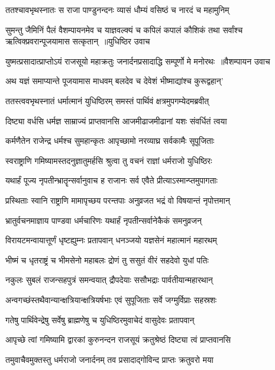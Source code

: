 \twolineshloka
{ततश्चावभृथस्नातः स राजा पाण्डुनन्दनः}
{व्यासं धौम्यं वसिष्ठं च नारदं च महामुनिम्}


\threelineshloka
{सुमन्तु जैमिनिं पैलं वैशम्पायनमेव च}
{याज्ञवल्क्यं च कपिलं कपालं कौशिकं तथा}
{सर्वांश्च ऋत्विक्प्रवरान्पूजयामास सत्कृतान् ॥युधिष्ठिर उवाच}


\twolineshloka
{युष्मत्प्रसादात्प्राप्तोऽयं राजसूयो महाक्रतुः}
{जनार्दनप्रसादाद्धि सम्पूर्णो मे मनोरथः ॥वैशम्पायन उवाच}


\twolineshloka
{अथ यज्ञं समाप्यान्ते पूजयामास माधवम्}
{बलदेव च देवेशं भीष्माद्यांश्च कुरूद्वहान्'}


\twolineshloka
{ततस्त्ववभृथस्नातं धर्मात्मानं युधिष्ठिरम्}
{समस्तं पार्थिवं क्षत्रमुपगम्येदमब्रवीत्}


\twolineshloka
{दिष्ट्या वर्धसि धर्मज्ञ साम्राज्यं प्राप्तवानसि}
{आजमीढाजमीढानां यशः संवर्धितं त्वया}


\twolineshloka
{कर्मणैतेन राजेन्द्र धर्मश्च सुमहान्कृतः}
{आपृच्छामो नरव्याघ्र सर्वकामैः सूपूजिताः}


\twolineshloka
{स्वराष्ट्राणि गमिष्यामस्तदनुज्ञातुमर्हसि}
{श्रुत्वा तु वचनं राज्ञां धर्मराजो युधिष्ठिरः}


\twolineshloka
{यथार्हं पूज्य नृपतीन्भ्रातॄन्सर्वानुवाच ह}
{राजानः सर्व एवैते प्रीत्याऽस्मान्प्तमुपागताः}


\twolineshloka
{प्रस्थिताः स्वानि राष्ट्राणि मामापृच्छय परन्तपाः}
{अनुव्रजत भद्रं वो विषयान्तं नृपोत्तमान्}


\twolineshloka
{भ्रातुर्वचनमाज्ञाय पाण्डवा धर्मचारिणः}
{यथार्हं नृपतीन्सर्वानेकैकं समनुव्रजन्}


\twolineshloka
{विरायटमन्वायात्तूर्णं धृष्टह्युम्नः प्रतापवान्}
{धनञ्जयो यज्ञसेनं महात्मानं महारथम्}


\twolineshloka
{भीष्मं च धृतराष्ट्रं च भीमसेनो महाबलः}
{द्रोणं तु ससुतं वीरं सहदेवो युधां पतिः}


\twolineshloka
{नकुलः सुबलं राजन्सहपुत्रं समन्वयात्}
{द्रौपदेयाः ससौभद्राः पार्वतीयान्महारथान्}


\twolineshloka
{अन्वगच्छंस्तथैवान्यान्क्षत्रियान्क्षत्रियर्षभाः}
{एवं सुपूजिताः सर्वे जग्मुर्विप्राः सहस्रशः}


\twolineshloka
{गतेषु पार्थिवेन्द्रेषु सर्वेषु ब्राह्मणेषु च}
{युधिष्ठिरमुवाचेदं वासुदेवः प्रतापवान्}


\twolineshloka
{आपृच्छे त्वां गमिष्यामि द्वारकां कुरुनन्दन}
{राजसूयं क्रतुश्रेष्ठं दिष्ट्या त्वं प्राप्तवानसि}


\twolineshloka
{तमुवाचैवमुक्तस्तु धर्मराजो जनार्दनम्}
{तव प्रसादाद्गोविन्द प्राप्तः क्रतुवरो मया}


